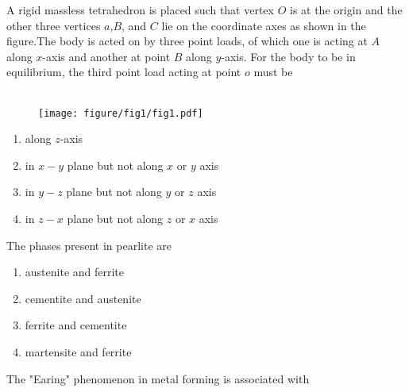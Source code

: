 

\iffalse
    \title{Assignment}
    \author{EE24BTECH11028}
    \section{ME}
    \chapter{2024}
  \fi
\item A rigid massless tetrahedron is placed such that vertex $O$ is at the origin and the other three vertices $a$,$B$, and $C$ lie on the coordinate axes as shown in the figure.The body is acted on by three point loads, of which one is acting at $A$ along $x$-axis and another at point $B$ along $y$-axis. For the body to be in equilibrium, the third point load acting at point $o$ must be\\\\
\begin{figure}[h!]
         \centering
        \texttt{[image: figure/fig1/fig1.pdf]}
		\caption{}
        \label{stemplot}

\end{figure}
\begin{enumerate}
    \item along $z$-axis\\
    \item in $x-y$ plane but not along $x$ or $y$ axis\\
    \item in $y-z$ plane but not along $y$ or $z$ axis\\
    \item in $z-x$ plane but not along $z$ or $x$ axis
\end{enumerate}
\item The phases present in pearlite are\\
\begin{enumerate}
    \item austenite and ferrite\\
    \item cementite and austenite\\
    \item ferrite and cementite\\
    \item martensite and ferrite
\end{enumerate}
\item The "Earing" phenomenon in metal forming is associated with\\
